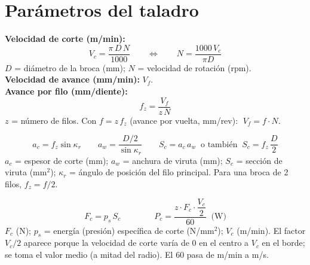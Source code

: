 \documentclass[12pt,a4paper]{article}
\begin{document}
\section{Parámetros del taladro}

\begin{formu}
	\textbf{Velocidad de corte (m/min):}
	\[ V_c = \frac{\pi\, D\, N}{1000} \qquad\Longleftrightarrow\qquad N =
		\frac{1000\,V_c}{\pi D} \]
	$D$ = diámetro de la broca (mm); $N$ = velocidad de rotación (rpm).\\[4pt]
	\textbf{Velocidad de avance (mm/min):} $V_f$.\\[4pt]
	\textbf{Avance por filo (mm/diente):}
	\[ f_z = \frac{V_f}{z\, N} \]
	$z$ = número de filos. Con $f = z\,f_z$ (avance por vuelta, mm/rev): $\;V_f =
		f\cdot N$.
\end{formu}

\begin{formu}
	\[ a_c = f_z \sin\kappa_r \qquad a_w = \frac{D/2}{\sin\kappa_r} \qquad S_c =
		a_c\, a_w \;\;\text{o también}\;\; S_c = f_z\,\frac{D}{2} \]
	$a_c$ = espesor de corte (mm); $a_w$ = anchura de viruta (mm); $S_c$ = sección
	de viruta (mm$^2$); $\kappa_r$ = ángulo de posición del filo principal. Para
	una broca de 2 filos, $f_z = f/2$.
\end{formu}

\begin{formu}
	\[ F_c = p_s\, S_c \qquad\qquad P_c = \frac{z\cdot F_c\cdot \dfrac{V_c}{2}}{60}
		\;\;\text{(W)} \]
	$F_c$ (N); $p_s$ = energía (presión) específica de corte (N/mm$^2$); $V_c$
	(m/min). El factor $V_c/2$ aparece porque la velocidad de corte varía de 0 en
	el
	centro a $V_c$ en el borde; se toma el valor medio (a mitad del radio). El 60
	pasa de m/min a m/s.
\end{formu}
\end{document}
